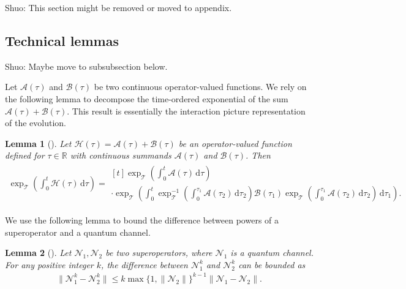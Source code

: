 \documentclass[aps,pra,reprint,groupedaddress,floatfix]{revtex4-2}
\newtheorem{lemma}{Lemma}
\renewcommand{\d}{\mathrm{d}}
\newcommand{\mc}{\mathcal}
\newcommand{\sz}[1]{{\color{blue} Shuo: #1}}
\begin{document}
\sz{This section might be removed or moved to appendix.}
\subsection{Technical lemmas}
\sz{Maybe move to subsubsection below.}

Let $\mc A(\tau)$ and $\mc B(\tau)$ be two continuous operator-valued functions. We rely on the following lemma to decompose the time-ordered exponential of the sum $\mc A(\tau) + \mc B(\tau)$. This result is essentially the interaction picture representation of the evolution.
\begin{lemma}[{\cite[Page 21]{dollard1984product}}]
\label{lem:interaction-pic}
    Let $\mc H(\tau) = \mc A(\tau) + \mc B(\tau)$ be an operator-valued function defined for $\tau \in \mathbb{R}$ with continuous summands $\mc A(\tau)$ and $\mc B(\tau)$. Then
    \begin{align*}
    \exp_{\mc T}\left(\int_{0}^{t}  \mc H(\tau)\, \d \tau\right) =  \begin{multlined}[t]
        \exp_{\mc T}\left(\int_{0}^{t}  \mc A(\tau)\, \d \tau\right) \\
     \cdot \exp_{\mc T}\left(\int_{0}^{t}\exp_{\mc T}^{-1}\left(\int_{0}^{\tau_1}  \mc A(\tau_2)\, \d \tau_2\right)\mc  B(\tau_1) \exp_{\mc T}\left(\int_{0}^{\tau_1}\mc  A(\tau_2)\, \d \tau_2\right)\, \d \tau_1\right).
    \end{multlined}
    \end{align*}
\end{lemma} 
We use the following lemma to bound the difference between powers of a superoperator and a quantum channel. 
\begin{lemma}[{\cite[Lemma~3]{wang2026lindbladiansimulationcommutatorbounds}}]
\label{lem:power-bound}
    Let $\mc N_1, \mc N_2$ be two superoperators, where $\mc N_1$ is a quantum channel. For any positive integer $k$, the difference between $\mc N_1^k$ and $\mc N_2^{k}$ can be bounded as
    \begin{align*}
        \|\mc N_1^k-\mc N_2^k\| \le k \max\{1, \|\mc N_2\|\}^{k-1} \|\mc N_1-\mc N_2\|.
    \end{align*}
\end{lemma}
\end{document}
